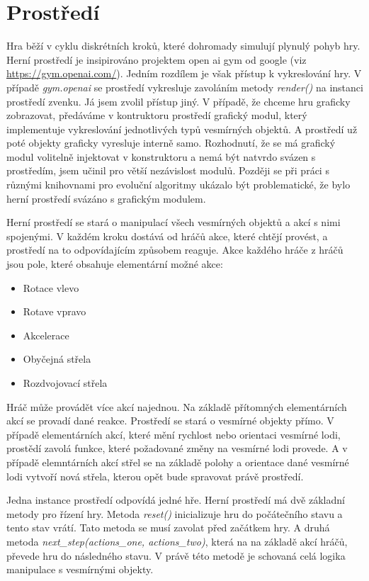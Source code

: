 \newpage



\section{Prostředí}

Hra běží v cyklu diskrétních kroků, které dohromady simulují plynulý pohyb hry.
Herní prostředí je insipirováno projektem open ai gym od google
(viz \url{https://gym.openai.com/}). Jedním rozdílem je však přístup k vykreslování hry. V případě \emph{gym.openai} se prostředí vykresluje zavoláním metody \emph{render()} na instanci prostředí zvenku.
Já jsem zvolil přístup jiný. V případě, že chceme hru graficky zobrazovat, předáváme v kontruktoru prostředí grafický modul, který implementuje vykreslování jednotlivých typů vesmírných objektů.
A prostředí už poté objekty graficky vyresluje interně samo. Rozhodnutí, že se má grafický modul volitelně injektovat v konstruktoru a nemá být natvrdo svázen s prostředím, jsem učinil pro větší nezávislost modulů. 
Později se při práci s různými knihovnami pro evoluční algoritmy ukázalo být problematické, že bylo herní prostředí svázáno s grafickým modulem.
\par

Herní prostředí se stará o manipulací všech vesmírných objektů a akcí s nimi spojenými. 
V každém kroku dostává od hráčů akce, které chtějí provést, a prostředí na to odpovídajícím způsobem reaguje. 
Akce každého hráče z hráčů jsou pole, které obsahuje elementární možné akce:
\begin{itemize}
    \item Rotace vlevo
    \item Rotave vpravo
    \item Akcelerace
    \item Obyčejná střela
    \item Rozdvojovací střela
\end{itemize} 
Hráč může provádět více akcí najednou. Na základě přítomných elementárních akcí se provadí dané reakce.
Prostředí se stará o vesmírné objekty přímo. V případě elementárních akcí, které mění rychlost nebo orientaci vesmírné lodi, prostědí zavolá funkce, které požadované změny na vesmírné lodi provede.
A v případě elemntárních akcí střel se na základě polohy a orientace dané vesmírné lodi vytvoří nová střela, kterou opět bude spravovat právě prostředí.


\par


Jedna instance prostředí odpovídá jedné hře. Herní prostředí má dvě základní metody pro řízení hry. 
\newline 
Metoda \emph{reset()} inicializuje hru do počátečního stavu a tento stav vrátí. Tato metoda se musí zavolat před začátkem hry.
\newline 
A druhá metoda \emph{next\_step(actions\_one, actions\_two)}, která na na základě akcí hráčů, převede hru do následného stavu.
V právě této metodě je schovaná celá logika manipulace s vesmírnými objekty.

